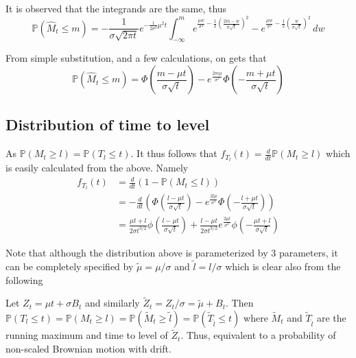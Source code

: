 \documentclass[../Thesis.tex]{subfiles}
\begin{document}
It is observed that the integrands are the same, thus
$$\mathbb{P}\left(\hat{M}_t \leq m\right) = -\frac{1}{\sigma \sqrt{2\pi t}} e^{-\frac{1}{2 \sigma^2} \mu^2 t } \int_{-\infty}^m  e^{\frac{\mu w}{\sigma^2} - \frac{1}{2} \left(\frac{2m - w}{\sigma \sqrt{t}}\right)^2} - e^{\frac{\mu w}{\sigma^2} - \frac{1}{2} \left(\frac{w}{\sigma \sqrt{t}}\right)^2}  \, dw$$

From simple substitution, and a few calculations, on gets that
$$\mathbb{P}\left(\hat{M}_t \leq m\right) = \Phi\left(\frac{m-\mu t}{\sigma \sqrt{t}}\right) - e^{\frac{2m\mu}{\sigma^2}} \Phi\left( -\frac{m+\mu t}{\sigma \sqrt{t}} \right)$$



\subsection{Distribution of time to level}
As $\mathbb{P}\left( M_t \geq l \right) = \mathbb{P}\left( T_l \leq t \right)$. It thus follows that $f_{T_l}(t) = \frac{d}{dt} \mathbb{P}\left( M_t \geq l \right)$ which is easily calculated from the above. Namely
\begin{align*}
    f_{T_l} (t) & = \frac{d}{dt}\left(1 - \mathbb{P}\left(M_t \leq l\right)\right)                                                                                                                                          \\
                & = - \frac{d}{dt} \left( \Phi\left(\frac{l-\mu t}{\sigma \sqrt{t}}\right) - e^{\frac{2l\mu}{\sigma^2}} \Phi\left( -\frac{l + \mu t}{\sigma \sqrt{t}} \right) \right)                                       \\
                & = \frac{\mu t + l}{2\sigma t^{3/2}}\phi\left(\frac{l-\mu t}{\sigma \sqrt{t}}\right) + \frac{l - \mu t }{2\sigma t^{3/2}} e^{\frac{2\mu l}{\sigma^2}} \phi\left(- \frac{\mu t + l}{\sigma \sqrt{t}}\right)
\end{align*}

Note that although the distribution above is parameterized by 3 parameters, it can be completely specified by $\tilde{\mu} = \mu /\sigma$ and $\tilde{l}=l/\sigma$ which is clear also from the following

Let $Z_t = \mu t + \sigma B_t$ and similarly $\tilde{Z}_t = Z_t/\sigma = \tilde{\mu} + B_t$. Then
$\mathbb{P} \left(T_l \leq t \right)
    = \mathbb{P} \left( M_t \geq l \right)
    = \mathbb{P} \left( \tilde{M}_t \geq \tilde{l} \right)
    = \mathbb{P} \left( \tilde{T}_{ \tilde{l} } \leq t \right)$
where $\tilde{M}_t$ and $\tilde{T}_{\tilde{l}}$ are the running maximum and time to level of $\tilde{Z}_t$. Thus, equivalent to a probability of non-scaled Brownian motion with drift.
\end{document}
